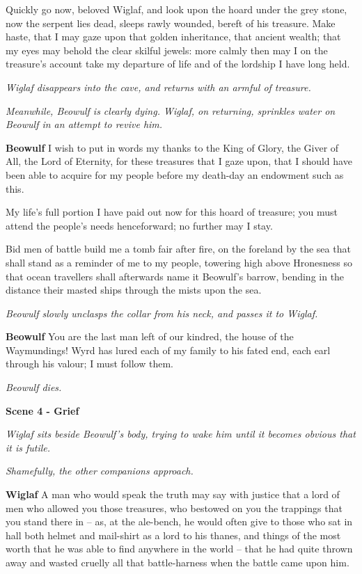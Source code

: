 \documentclass[a4paper]{article}
\begin{document}
{Quickly go now,
beloved Wiglaf, and look upon the hoard
under the grey stone, now the serpent lies dead,
sleeps rawly wounded, bereft of his treasure.
Make haste, that I may gaze upon that golden inheritance,
that ancient wealth; that my eyes may behold
the clear skilful jewels: more calmly then may I
on the treasure’s account take my departure
of life and of the lordship I have long held.

\centerline{\textit{Wiglaf disappears into the cave, and returns with an armful of treasure.}}
\centerline{\textit{Meanwhile, Beowulf is clearly dying. Wiglaf, on returning, 
sprinkles water on Beowulf in an attempt to revive him.}}

\textbf{Beowulf} I wish to put in words my thanks
to the King of Glory, the Giver of All,
the Lord of Eternity, for these treasures that I gaze upon,
that I should have been able to acquire for my people
before my death-day an endowment such as this.

My life’s full portion I have paid out now
for this hoard of treasure; you must attend the people’s
needs henceforward; no further may I stay.

Bid men of battle build me a tomb
fair after fire, on the foreland by the sea
that shall stand as a reminder of me to my people,
towering high above Hronesness
so that ocean travellers shall afterwards name it
Beowulf’s barrow, bending in the distance
their masted ships through the mists upon the sea.

\centerline{\textit{Beowulf slowly unclasps the collar from his neck, and passes it to Wiglaf.}}

\textbf{Beowulf} You are the last man left of our kindred,
the house of the Waymundings! Wyrd has lured
each of my family to his fated end,
each earl through his valour; I must follow them.

\centerline{\textit{Beowulf dies.}}

\centerline{\textbf{Scene 4 - Grief}}
\centerline{\textit{Wiglaf sits beside Beowulf's body, trying to wake him until it becomes obvious that it is futile.}}
\centerline{\textit{Shamefully, the other companions approach.}}

\textbf{Wiglaf} A man who would speak the truth may say with justice
that a lord of men who allowed you those treasures,
who bestowed on you the trappings that you stand there in
– as, at the ale-bench, he would often give
to those who sat in hall both helmet and
mail-shirt
as a lord to his thanes, and things of the most worth
that he was able to find anywhere in the world –
that he had quite thrown away and wasted cruelly
all that battle-harness when the battle came upon him.

}
\end{document}
